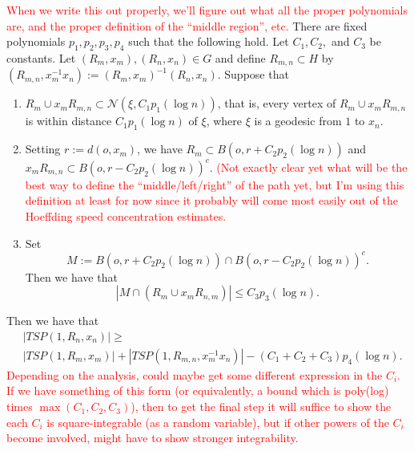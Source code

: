\begin{lem} \label{lem:deterministic}
   \textcolor{red}{When we write this out properly, we'll figure out what all the proper polynomials are, and the proper definition of the ``middle region'', etc.}
   There are fixed polynomials $p_1,p_2,p_3,p_4$ such that the following hold.
   Let $C_1, C_2,$ and $C_3$ be
   constants. 
   Let $(R_m,x_m), (R_n,x_n) \in G$
   and define $R_{m,n} \subset H$
   by 
   $(R_{m,n}, x_m^{-1} x_n) :=
   (R_m, x_m)^{-1} (R_n, x_n)$.
   Suppose that
   \begin{enumerate}
       \item $R_m \cup x_m R_{m,n} \subset \mathcal{N}(\xi, C_1 p_1(\log n))$,
       that is,
       every vertex of $R_m \cup x_m R_{m,n}$ is within distance 
       $C_1 p_1(\log n)$ of $\xi$, 
       where $\xi$ is a geodesic
       from $1$ to $x_n$.
       \item Setting $r := d(o,x_m)$,
       we have 
       $R_m \subset B(o,r+C_2 p_2(\log n))$ and
       $x_m R_{m,n} \subset
       B(o, r - C_2 p_2(\log n))^c$.
       \textcolor{red}{(Not exactly
       clear yet what will be the best way to define the ``middle/left/right'' of the path yet, but I'm using this definition at least for now since it probably will come most easily out of the Hoeffding speed concentration estimates.}
       \item Set
       \[
          M := B(o,r+C_2 p_2(\log n)) \cap B(o, r - C_2 p_2(\log n))^c.
       \]
       Then we have that
       \[
          |M \cap (R_m \cup x_m R_{n,m})| \le C_3 p_3(\log n).
       \]
   \end{enumerate}
   Then we have that
   \begin{align*}
      &|TSP(1,R_n,x_n)| \ge \\
      &|TSP(1,R_m,x_m)| +
      |TSP(1,R_{m,n}, x_m^{-1} x_n)|
      - (C_1 + C_2 + C_3)p_4(\log n).
   \end{align*}
   \textcolor{red}{Depending on the analysis, could maybe get some 
   different expression in the 
   $C_i$. If we have something
   of this form (or equivalently,
   a bound which is poly(log) times
   $\max(C_1, C_2, C_3)$),
   then to get the final step
   it will suffice to show the each
   $C_i$ is square-integrable (as 
   a random variable), but
   if other powers of the $C_i$
   become involved, might
   have to show stronger
   integrability.}
\end{lem}

